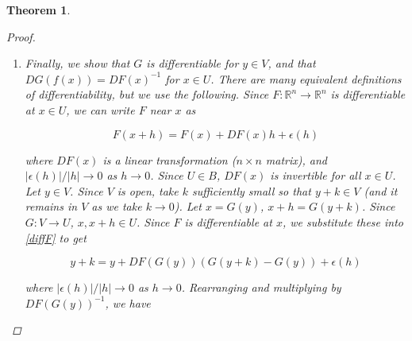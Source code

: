\documentclass{article}
\newtheorem{theorem}{Theorem}[section]
\def\R{{\mathbb R}}
\begin{document}
\begin{theorem}
\begin{proof}
\begin{enumerate}
Thus since $N(\cdot; y)$ is a contraction, we have

\begin{align*}
|x_1 - x_2| - |J_0^{-1} (F(x_1) - F(x_2))| &\leq |(x_1 - x_2) - J_0^{-1} (F(x_1) - F(x_2))| \\
&= |N(x_1; y) - N(x_2; y)| \\
&\leq \frac{1}{2}|x_1 - x_2|
\end{align*}

Rearrange to get 

\begin{align*}
\frac{1}{2}|x_1 - x_2| &\leq |J_0^{-1} (F(x_1) - F(x_2))| \\
|x_1 - x_2| &\leq 2 |||J_0^{-1}|| \: |F(x_1) - F(x_2)|
\end{align*}

Substituting in $x_1 = G(y_1), x_2 = G(y_2)$ and noting that $G$ is the inverse of $F$, this becomes

\begin{align}\label{Glip}
|G(y_1) - G(y_2)| &\leq 2 |||J_0^{-1}|| \: |y_1 - y_2|
\end{align}

This implies $G$ is Lipschitz, thus continuous.

\item Finally, we show that $G$ is differentiable for $y \in V$, and that $DG(f(x)) = DF(x)^{-1}$ for $x \in U$. There are many equivalent definitions of differentiability, but we use the following. Since $F: \R^n \rightarrow \R^n$ is differentiable at $x \in U$, we can write $F$ near $x$ as

\begin{equation}\label{diffF}
F(x + h) = F(x) + DF(x)h + \epsilon(h)
\end{equation}

where $DF(x)$ is a linear transformation ($n \times n$ matrix), and $|\epsilon(h)|/|h| \rightarrow 0$ as $h \rightarrow 0$. Since $U \in B$, $DF(x)$ is invertible for all $x \in U$. \\

Let $y \in V$. Since $V$ is open, take $k$ sufficiently small so that $y + k \in V$ (and it remains in $V$ as we take $k \rightarrow 0$). Let $x = G(y)$, $x + h = G(y + k)$. Since $G: V \rightarrow U$, $x, x+h \in U$. Since $F$ is differentiable at $x$, we substitute these into \eqref{diffF} to get

\[
y + k = y + DF(G(y))(G(y + k) - G(y)) + \epsilon(h)
\]

where $|\epsilon(h)|/|h| \rightarrow 0$ as $h \rightarrow 0$. Rearranging and multiplying by $DF(G(y))^{-1}$, we have


\end{enumerate}
\end{proof}
\end{theorem}
\end{document}
